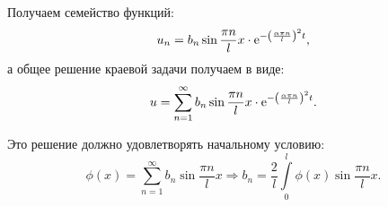 Получаем семейство функций:
\[
    u_n = b_n\sin\frac{\pi n}{l}x \cdot \mathrm{e}^{-\left(\frac{\alpha\pi n}
    {l}\right)^2t},
\]
а общее решение краевой задачи получаем в виде:
\[
    u = \sum\limits_{n = 1}^\infty b_n\sin\frac{\pi n}{l}x \cdot
    \mathrm{e}^{-\left(\frac{\alpha\pi n}{l}\right)^2t}.
\]

Это решение должно удовлетворять начальному условию:
\[
    \phi(x) = \sum\limits_{n = 1}^\infty b_n\sin\frac{\pi n}{l}x \Rightarrow
    b_n = \frac{2}{l}\int\limits_0^l \phi(x)\sin\frac{\pi n}{l}x.
\]

\newpage %

